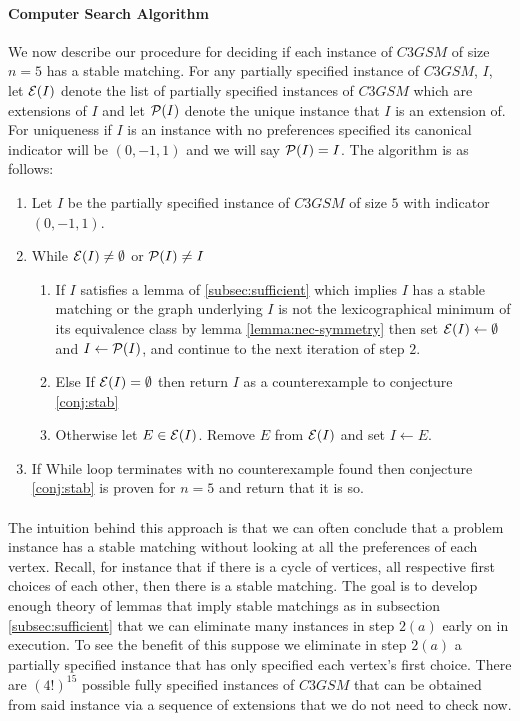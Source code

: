\paragraph{Computer Search Algorithm}
We now describe our procedure for deciding if each instance of $C3GSM$ of size $n=5$ has a stable matching. For any partially specified instance of $C3GSM$, $I$, let $\mathcal{E}(I)$ denote the list of partially specified instances of $C3GSM$ which are extensions of $I$ and let $\mathcal{P}(I)$ denote the unique instance that $I$ is an extension of. For uniqueness if $I$ is an instance with no preferences specified its canonical indicator will be $(0,-1,1)$ and we will say $\mathcal{P}(I) = I$. The algorithm is as follows:
\begin{enumerate}
\item Let $I$ be the partially specified instance of $C3GSM$ of size $5$ with indicator $(0,-1,1)$.
\item While $\mathcal{E}(I) \neq \emptyset$ or $\mathcal{P}(I) \neq I$
	\begin{enumerate}
	\item If $I$ satisfies a lemma of \ref{subsec:sufficient} which implies $I$ has a stable matching or the graph underlying $I$ is not the lexicographical minimum of its equivalence class by lemma \ref{lemma:nec-symmetry} then set $\mathcal{E}(I) \leftarrow \emptyset$ and $I \leftarrow \mathcal{P}(I)$, and continue to the next iteration of step $2$.
	\item Else If $\mathcal{E}(I) = \emptyset$ then return $I$ as a counterexample to conjecture \ref{conj:stab}
	\item Otherwise let $E \in \mathcal{E}(I)$. Remove $E$ from $\mathcal{E}(I)$ and set $I \leftarrow E$. 
	\end{enumerate}
\item If While loop terminates with no counterexample found then conjecture \ref{conj:stab} is proven for $n=5$ and return that it is so.
\end{enumerate}
\paragraph{}
The intuition behind this approach is that we can often conclude that a problem instance has a stable matching without looking at all the preferences of each vertex. Recall, for instance that if there is a cycle of vertices, all respective first choices of each other, then there is a stable matching. The goal is to develop enough theory of lemmas that imply stable matchings as in subsection \ref{subsec:sufficient} that we can eliminate many instances in step $2(a)$ early on in execution. To see the benefit of this suppose we eliminate in step $2(a)$ a partially specified instance that has only specified each vertex's first choice. There are $(4!)^{15}$ possible fully specified instances of $C3GSM$ that can be obtained from said instance via a sequence of extensions that we do not need to check now.
